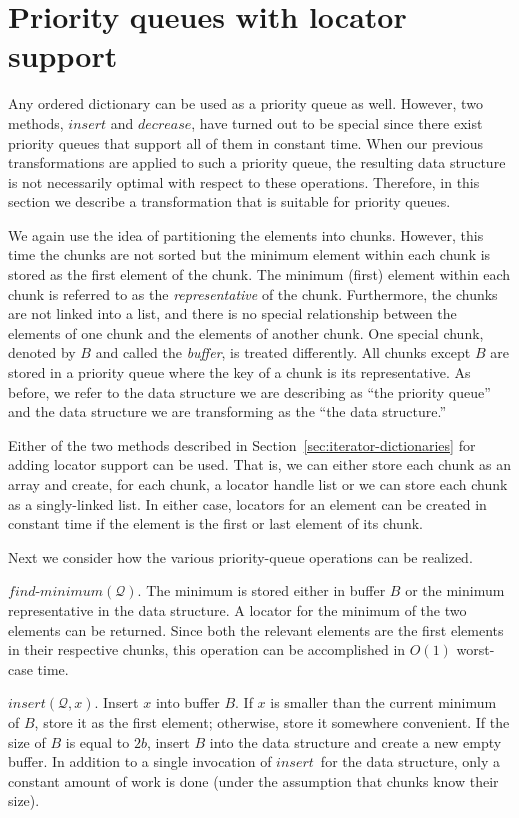 \documentclass{DIKU-article}
\newcommand{\Findmin}{\mbox{$\mathit{find}$\textnormal{-}}\allowbreak{}\mbox{$\mathit{minimum}$}}
\newcommand{\Insert}{\mbox{$\mathit{insert}$}}
\newcommand{\Decrease}{\mbox{$\mathit{decrease}$}}
\newcommand{\seclabel}[1]{\label{sec:#1}}
\newcommand{\secref}[1]{\mbox{Section~\ref{sec:#1}}}
\begin{document}
\section{Priority queues with locator support}\seclabel{iterator-queues}

Any ordered dictionary can be used as a priority queue as well.
However, two methods, \Insert{} and \Decrease{}, have turned out to be
special since there exist priority queues that support all of them in
constant time.  When our previous transformations are applied to such
a priority queue, the resulting data structure is not necessarily
optimal with respect to these operations. Therefore, in this section
we describe a transformation that is suitable for priority queues.

We again use the idea of partitioning the elements into chunks.
However, this time the chunks are not sorted but the minimum element
within each chunk is stored as the first element of the chunk.  The
minimum (first) element within each chunk is referred to as the
\emph{representative} of the chunk.  Furthermore, the chunks are not
linked into a list, and there is no special relationship between the
elements of one chunk and the elements of another chunk. One special
chunk, denoted by $B$ and called the \emph{buffer}, is treated
differently.  All chunks except $B$ are stored in a priority queue
where the key of a chunk is its representative.  As before, we refer
to the data structure we are describing as ``the priority queue'' and
the data structure we are transforming as the ``the data structure.''

Either of the two methods described in \secref{iterator-dictionaries}
for adding locator support can be used.  That is, we can either store
each chunk as an array and create, for each chunk, a locator handle
list or we can store each chunk as a singly-linked list. In either
case, locators for an element can be created in constant time if the
element is the first or last element of its chunk. 

Next we consider how the various priority-queue operations can be
realized.

\Findmin{}$(\mathcal{Q})$. The minimum is stored either in buffer $B$
or the minimum representative in the data structure. A locator for
the minimum of the two elements can be returned. Since both the
relevant elements are the first elements in their respective chunks,
this operation can be accomplished in $O(1)$ worst-case time.

\Insert{}$(\mathcal{Q}, x)$. Insert $x$ into buffer $B$. If $x$ is
smaller than the current minimum of $B$, store it as the first
element; otherwise, store it somewhere convenient. If the size of $B$
is equal to $2b$, insert $B$ into the data structure and create a new
empty buffer.  In addition to a single invocation of \Insert\ for the
data structure, only a constant amount of work is done (under the
assumption that chunks know their size).
\end{document}
